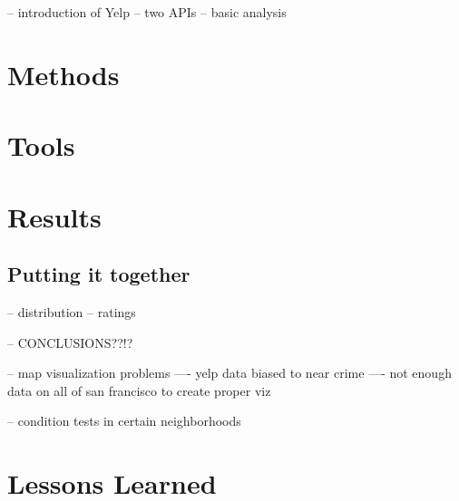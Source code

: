 \documentclass{article}
\begin{document}
-- introduction of Yelp
-- two APIs
-- basic analysis

\section{Methods}

\section{Tools}

\section{Results}

\subsection{Putting it together}

-- distribution
-- ratings

-- CONCLUSIONS??!?

-- map visualization problems
---- yelp data biased to near crime
---- not enough data on all of san francisco to create proper viz

-- condition tests in certain neighborhoods

\section{Lessons Learned}
\label{sec:lessons-learned}



\end{document}
